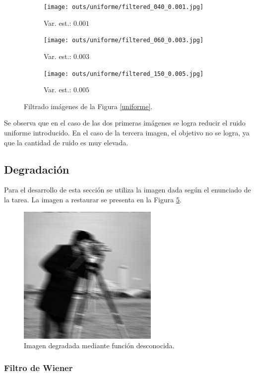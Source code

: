 \documentclass[
  letterpaper,
  twocolumn,
  9pt,
  journal,
  final]{IEEEtran}
\begin{document}
\begin{figure}[!tbh]
  \centering
  \begin{subfigure}[b]{.32\linewidth}
    \texttt{[image: outs/uniforme/filtered\_040\_0.001.jpg]}
    \caption{Var. est.: $0.001$}
    \label{uni_filtrado_1}
  \end{subfigure}
  \begin{subfigure}[b]{.32\linewidth}
    \texttt{[image: outs/uniforme/filtered\_060\_0.003.jpg]}
    \caption{Var. est.: $0.003$}
    \label{uni_filtrado_2}
  \end{subfigure}
  \begin{subfigure}[b]{.32\linewidth}
    \texttt{[image: outs/uniforme/filtered\_150\_0.005.jpg]}
    \caption{Var. est.: $0.005$}
    \label{uni_filtrado_3}
  \end{subfigure}
  \caption{Filtrado imágenes de la Figura \ref{uniforme}.}
  \label{uniforme_filtrado}
\end{figure}

Se observa que en el caso de las dos primeras imágenes se logra reducir el ruido uniforme introducido. En el caso de la tercera imagen, el objetivo no se logra, ya que la cantidad de ruido es muy elevada.

\subsection{Degradación}

Para el desarrollo de esta sección se utiliza la imagen dada según el enunciado de la tarea. La imagen a restaurar se presenta en la Figura \ref{cameraman_deg}.

\begin{figure}[!tbh]
  \centering
  \includegraphics[width=0.4\linewidth]{inputs/cameraman_noisy.jpg}
  \caption{Imagen degradada mediante función desconocida.}
  \label{cameraman_deg}
\end{figure}


\subsubsection{Filtro de Wiener}
\end{document}
